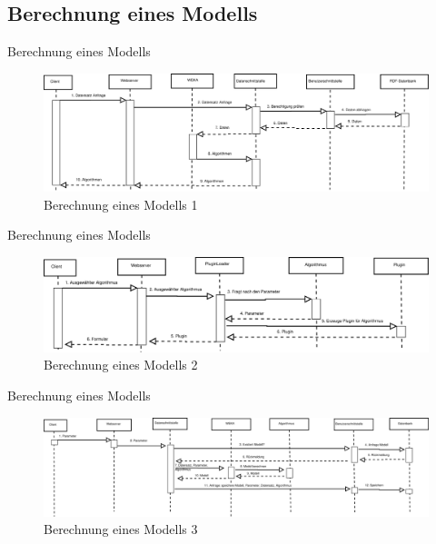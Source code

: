 \documentclass{beamer}
\begin{document}
		\subsection[Berechnung]{Berechnung eines Modells}
		\begin{frame}{Berechnung eines Modells}	
			\begin{figure}
				\centering
				\includegraphics[width=\linewidth]{Grafik/Diagramm/Szenarios/Berechnung}
				\caption{Berechnung eines Modells 1}
				\label{fig:Berechnung1}
			\end{figure}
		\end{frame}
		\begin{frame}{Berechnung eines Modells}	
			\begin{figure}
				\centering
				\includegraphics[width=\linewidth]{Grafik/Diagramm/Szenarios/Berechnung2}
				\caption{Berechnung eines Modells 2}
				\label{fig:Berechnung2}
			\end{figure}
		\end{frame}
		\begin{frame}{Berechnung eines Modells}	
			\begin{figure}
				\centering
				\includegraphics[width=\linewidth]{Grafik/Diagramm/Szenarios/Berechnung3}
				\caption{Berechnung eines Modells 3}
				\label{fig:Berechnung3}
			\end{figure}
		\end{frame}	
		
\end{document}
